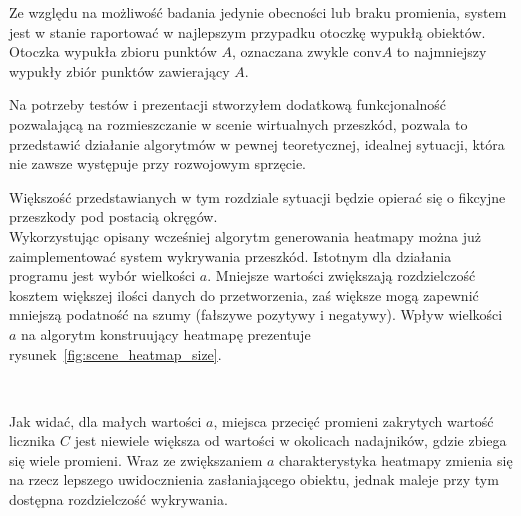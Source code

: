 Ze względu na możliwość badania jedynie obecności lub braku promienia, system jest w stanie raportować w najlepszym przypadku otoczkę wypukłą obiektów. Otoczka wypukła zbioru punktów $A$, oznaczana zwykle $\mbox{conv} A$ to najmniejszy wypukły zbiór punktów zawierający $A$.\\

\clearpage

Na potrzeby testów i prezentacji stworzyłem dodatkową funkcjonalność pozwalającą na rozmieszczanie w scenie wirtualnych przeszkód, pozwala to przedstawić działanie algorytmów w pewnej teoretycznej, idealnej sytuacji, która nie zawsze występuje przy rozwojowym sprzęcie.

Większość przedstawianych w tym rozdziale sytuacji będzie opierać się o fikcyjne przeszkody pod postacią okręgów.\\

Wykorzystując opisany wcześniej algorytm generowania heatmapy można już zaimplementować system wykrywania przeszkód. Istotnym dla działania programu jest wybór wielkości $a$. Mniejsze wartości zwiększają rozdzielczość kosztem większej ilości danych do przetworzenia, zaś większe mogą zapewnić mniejszą podatność na szumy (fałszywe pozytywy i negatywy). Wpływ wielkości $a$ na algorytm konstruujący heatmapę prezentuje rysunek~\ref{fig:scene_heatmap_size}.

\begin{sidewaysfigure}[tbh]
  \myfloatalign
   \quad
   \\
   \quad
  \caption[Wpływ wielkości $a$ na algorytm konstrukcji heatmapy.]{Wpływ wielkości $a$ na algorytm konstrukcji heatmapy.}\label{fig:scene_heatmap_size}
\end{sidewaysfigure}


Jak widać, dla małych wartości $a$, miejsca przecięć promieni zakrytych wartość licznika $C$ jest niewiele większa od wartości w okolicach nadajników, gdzie zbiega się wiele promieni. Wraz ze zwiększaniem $a$ charakterystyka heatmapy zmienia się na rzecz lepszego uwidocznienia zasłaniającego obiektu, jednak maleje przy tym dostępna rozdzielczość wykrywania.\\


